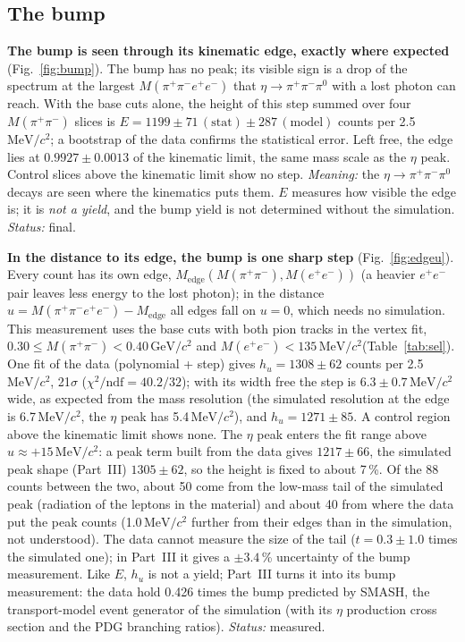 \documentclass[11pt,a4paper]{article}
\newcommand{\piz}{\ensuremath{\pi^{0}}\xspace}
\newcommand{\ee}{\ensuremath{e^{+}e^{-}}\xspace}
\newcommand{\pipi}{\ensuremath{\pi^{+}\pi^{-}}\xspace}
\newcommand{\Mfour}{\ensuremath{M(\pi^{+}\pi^{-}e^{+}e^{-})}\xspace}
\newcommand{\Mee}{\ensuremath{M(e^{+}e^{-})}\xspace}
\newcommand{\Mpipi}{\ensuremath{M(\pi^{+}\pi^{-})}\xspace}
\newcommand{\GeVcc}{\ensuremath{\mathrm{GeV}/c^{2}}\xspace}
\newcommand{\MeVcc}{\ensuremath{\mathrm{MeV}/c^{2}}\xspace}
\newcommand{\Medge}{\ensuremath{M_{\mathrm{edge}}}\xspace}%
\begin{document}
\subsection{The bump}
\label{sec:bump}
\textbf{The bump is seen through its kinematic edge, exactly where expected} (Fig.~\ref{fig:bump}). The bump has no peak; its visible sign
is a drop of the spectrum at the largest \Mfour that $\eta\to\pipi\piz$ with a lost photon can reach. With the base cuts alone, the height
of this step summed over four \Mpipi slices is $E=1199\pm71\,(\mathrm{stat})\pm287\,(\mathrm{model})$ counts per 2.5\,\MeVcc; a bootstrap
of the data confirms the statistical error. Left free, the edge lies at $0.9927\pm0.0013$ of the kinematic limit, the same mass scale as
the $\eta$ peak. Control slices above the kinematic limit show no step. \emph{Meaning:} the $\eta\to\pipi\piz$ decays are seen where the
kinematics puts them. $E$ measures how visible the edge is; it is \emph{not a yield}, and the bump yield is not determined without the
simulation. \emph{Status:} final.

\textbf{In the distance to its edge, the bump is one sharp step} (Fig.~\ref{fig:edgeu}). Every count has its own edge,
$\Medge(\Mpipi,\Mee)$ (a heavier \ee pair leaves less energy to the lost photon); in the distance $u=\Mfour-\Medge$ all edges fall on $u=0$,
which needs no simulation. This measurement uses the base cuts with both pion tracks in the vertex fit, $0.30\le\Mpipi<0.40$\,\GeVcc and
$\Mee<135$\,\MeVcc (Table~\ref{tab:sel}). One fit of the data (polynomial + step) gives $h_u=1308\pm62$ counts per 2.5\,\MeVcc, 21$\sigma$
($\chi^2/\mathrm{ndf}=40.2/32$); with its width free the step is $6.3\pm0.7$\,\MeVcc wide, as expected from the mass resolution (the
simulated resolution at the edge is 6.7\,\MeVcc, the $\eta$ peak has 5.4\,\MeVcc), and $h_u=1271\pm85$. A control region above the
kinematic limit shows none. The $\eta$ peak enters the fit range above $u\approx+15$\,\MeVcc: a peak term built from the data gives
$1217\pm66$, the simulated peak shape (Part~III) $1305\pm62$, so the height is fixed to about 7\,\%. Of the 88 counts between the two,
about 50 come from the low-mass tail of the simulated peak (radiation of the leptons in the material) and about 40 from where the data put
the peak counts (1.0\,\MeVcc further from their edges than in the simulation, not understood). The data cannot measure the size of the
tail ($t=0.3\pm1.0$ times the simulated one); in Part~III it gives a $\pm3.4$\,\% uncertainty of the bump measurement. Like $E$, $h_u$ is
not a yield; Part~III turns it into its bump measurement: the data hold 0.426 times the bump predicted by SMASH, the transport-model
event generator of the simulation (with its $\eta$ production cross section and the PDG branching ratios). \emph{Status:} measured.
\end{document}
